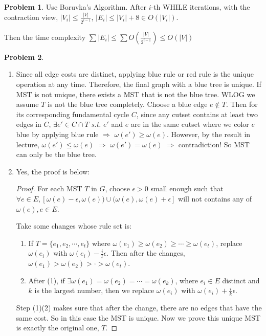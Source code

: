 \documentclass[a4paper]{article}
\theoremstyle{definition}
\newtheorem{problem}{Problem}
\theoremstyle{plain}
\newcommand{\dps}{\displaystyle}
\numberwithin{equation}{problem}
\newcommand{\st}{ \textit{ s.t. }}
\begin{document}
\begin{problem}
  Use Boruvka's Algorithm. After  $ i $-th  WHILE iterations, with the contraction view, $  |V_i| \leq \dps\frac{|V|}{2^{i-1}}  $,  $ |E_i| \leq |V_i|+8 \in O(|V_i|)$.
  
  Then the time complexity  $ \dps\sum|E_i| \leq \dps\sum O(\frac{|V|}{2^{i-1}}) \leq O(|V|) $ 
\end{problem}
\begin{problem}
  \begin{enumerate}[label=(\alph*)]
    \item Since all edge costs are distinct, applying blue rule or red rule is the unique operation at any time. Therefore, the final graph with a blue tree is unique. If MST is not unique, there exists a MST that is not the blue tree. WLOG we assume  $ T $ is not the blue tree completely. Choose a blue edge  $ e\not\in T $. Then for  its corresponding fundamental cycle   $ C $, since any cutset contains at least two edges in  $ C $,  $ \exists e'\in C\cap T $ \st  $ e' $ and  $ e $ are in the same cutset where  we color  $ e $ blue by applying blue rule $ \Rightarrow $      $ \omega(e') \geq \omega(e) $. However, by the result in lecture,  $ \omega(e') \leq \omega(e) $ $ \Rightarrow  $  $ \omega(e')=\omega(e) $ $ \Rightarrow  $ contradiction!      So  MST can only be the blue tree.
    \item Yes, the proof is below:
    \begin{proof}
      For each MST  $ T $ in  $ G $, choose  $ \epsilon>0 $ small enough such that  $\forall e\in E, [\omega(e)-\epsilon,\omega(e))\cup(\omega(e),\omega(e)+\epsilon] $ will not contains any of  $ \omega(e),e\in E $.
      
      Take some changes whose rule set is:
      \begin{enumerate}[label=(\arabic*)]
        \item If  $ T=\{e_1,e_2,\cdots,e_t\} $ where  $ \omega(e_1)  \geq  \omega(e_2)  \geq  \cdots  \geq  \omega(e_t) $, replace  $ \omega(e_i) $ with  $ \omega(e_i)-\frac{i}{t}\epsilon $. Then after the changes,  $ \omega(e_1)>\omega(e_2)>\cdot>\omega(e_t) $.  
        \item   After (1), if  $ \exists \omega(e_1)=\omega(e_2)=\cdots=\omega(e_k) $, where  $ e_i\in E $ distinct and  $ k $ is the largest number, then we replace  $ \omega(e_i) $ with  $ \omega(e_i)+\frac{i}{k}\epsilon $.     
      \end{enumerate}
      Step (1)(2) makes sure that after the change, there are no edges that have the same cost. So in this case the MST is unique. Now we prove this unique MST is exactly the original one,  $ T $.
      

\end{proof}
\end{enumerate}
\end{problem}
\end{document}
